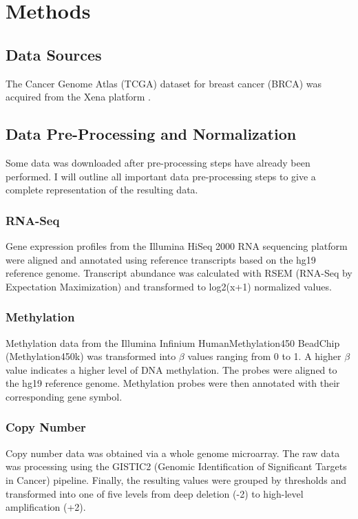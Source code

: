 \section{Methods}
\countem

\subsection{Data Sources}

The Cancer Genome Atlas (TCGA) dataset for breast cancer (BRCA)\cite{Ciriello2015} was acquired from the Xena platform \cite{Goldman2018}.

\subsection{Data Pre-Processing and Normalization}

Some data was downloaded after pre-processing steps have already been performed.
I will outline all important data pre-processing steps to give a complete representation of the resulting data.

\subsubsection{RNA-Seq}

Gene expression profiles from the Illumina HiSeq 2000 RNA sequencing platform were aligned and annotated using reference transcripts based on the hg19 reference genome.
Transcript abundance was calculated with RSEM (RNA-Seq by Expectation Maximization) and transformed to log2(x+1) normalized values.

\subsubsection{Methylation}

Methylation data from the Illumina Infinium HumanMethylation450 BeadChip (Methylation450k) was transformed into $\beta$ values ranging from 0 to 1.
A higher $\beta$ value indicates a higher level of DNA methylation.
The probes were aligned to the hg19 reference genome.
Methylation probes were then annotated with their corresponding gene symbol.

\subsubsection{Copy Number}

Copy number data was obtained via a whole genome microarray.
The raw data was processing using the GISTIC2 (Genomic Identification of Significant Targets in Cancer) pipeline.
Finally, the resulting values were grouped by thresholds and transformed into one of five levels from deep deletion (-2) to high-level amplification (+2).


